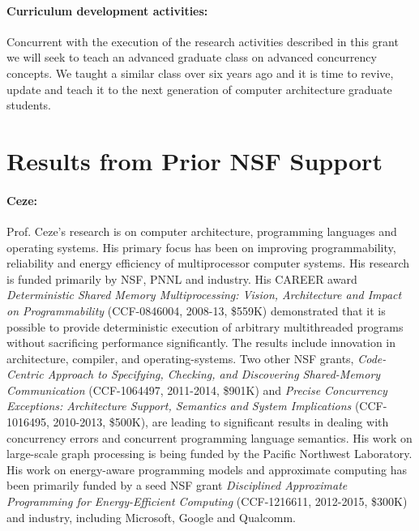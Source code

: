 \paragraph{Curriculum development activities:} Concurrent with the execution of the research activities described in this grant we will seek to teach an advanced graduate class on advanced concurrency concepts.  We taught a similar class over six years ago and it is time to revive, update and teach it to the next generation of computer architecture graduate students.  


\section{Results from Prior NSF Support}

\paragraph{Ceze:} Prof. Ceze's research is on computer architecture, programming languages and operating systems. His primary focus has been on improving programmability, reliability and energy efficiency of multiprocessor computer systems. His research is funded primarily by NSF, PNNL and industry. His CAREER award {\em Deterministic Shared Memory Multiprocessing: Vision, Architecture and Impact on Programmability} (CCF-0846004, 2008-13, \$559K) demonstrated that it is possible to provide deterministic execution of arbitrary multithreaded programs without sacrificing performance significantly. The results include innovation in architecture, compiler, and operating-systems. Two other NSF grants, {\em Code-Centric Approach to Specifying, Checking, and Discovering Shared-Memory Communication} (CCF-1064497, 2011-2014, \$901K) and {\em Precise Concurrency Exceptions: Architecture Support, Semantics and System Implications} (CCF-1016495, 2010-2013, \$500K), are leading to significant results in dealing with concurrency errors and concurrent programming language semantics. His work on large-scale graph processing is being funded by the Pacific Northwest Laboratory. His work on energy-aware programming models and approximate computing has been primarily funded by a seed NSF grant {\em Disciplined Approximate Programming for Energy-Efficient Computing} (CCF-1216611, 2012-2015, \$300K) and industry, including Microsoft, Google and Qualcomm.

